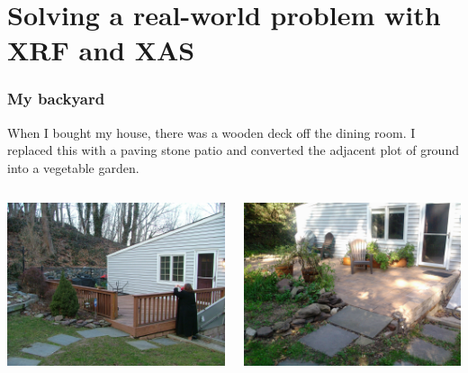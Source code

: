 \documentclass[10pt, xcolor=x11names, compress]{beamer}
\begin{document}
\section[Real-world problem]{Solving a real-world problem with XRF and XAS}

\begin{frame}
  \frametitle{My backyard}
  When I bought my house, there was a wooden deck off the dining
  room.  I replaced this with a paving stone patio and converted the
  adjacent plot of ground into a vegetable garden.

  \medskip

  \begin{columns}[T]
    \begin{column}{0.5\linewidth}
      \includegraphics[width=\linewidth]{garden/wooden_deck.jpg}      
    \end{column}
    \begin{column}{0.5\linewidth}
      \includegraphics[width=\linewidth]{garden/stone_deck.jpg}
    \end{column}
  \end{columns}
\end{frame}
\end{document}
